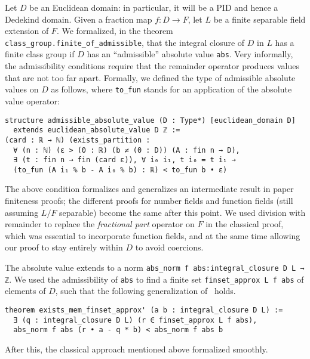 \documentclass[a4paper,USenglish,cleveref, autoref, thm-restate]{lipics-v2021}
\newcommand{\lean}[1]{\texttt{#1}\xspace} %
\begin{document}
Let $D$ be an Euclidean domain: in particular, it will be a PID and hence a Dedekind domain. Given a fraction map $f \colon D \to F$, let $L$ be a finite separable field extension of $F$.
We formalized, in the theorem \lean{class\_group.finite\_of\_admissible}, that the integral closure of $D$ in $L$ has a finite class group if $D$ has an ``admissible'' absolute value \lean{abs}.
Very informally, the admissibility conditions require that the remainder operator produces values that are not too far apart.
Formally, we defined the type of admissible absolute values on $D$ as follows, where \lean{to\_fun} stands for an application of the absolute value operator:
\pagebreak[3] %
\begin{lstlisting}
structure admissible_absolute_value (D : Type*) [euclidean_domain D]
  extends euclidean_absolute_value D ℤ :=
(card : ℝ → ℕ) (exists_partition :
  ∀ (n : ℕ) (ε > (0 : ℝ) (b ≠ (0 : D)) (A : fin n → D),
  ∃ (t : fin n → fin (card ε)), ∀ i₀ i₁, t i₀ = t i₁ →
  (to_fun (A i₁ % b - A i₀ % b) : ℝ) < to_fun b • ε)
\end{lstlisting}

The above condition formalizes and generalizes an intermediate result in paper finiteness proofs;
the different proofs for number fields and function fields (still assuming $L/F$ separable) become the same after this point.
We used division with remainder to replace the \emph{fractional part} operator on $F$ in the classical proof, which was essential to incorporate function fields, and at the same time allowing our proof to stay entirely within $D$ to avoid coercions.

The absolute value extends to a norm \lean{abs\_norm f abs:integral\_closure D L → ℤ}.
We used the admissibility of \lean{abs} to find a finite set \lean{finset\_approx L f abs} of elements of $D$,
such that the following generalization of~\cite[Theorem~12.2.1]{Ireland-Rosen} holds.
\begin{lstlisting}
theorem exists_mem_finset_approx' (a b : integral_closure D L) :=
  ∃ (q : integral_closure D L) (r ∈ finset_approx L f abs),
  abs_norm f abs (r • a - q * b) < abs_norm f abs b
\end{lstlisting}
After this, the classical approach mentioned above formalized smoothly.
\end{document}
